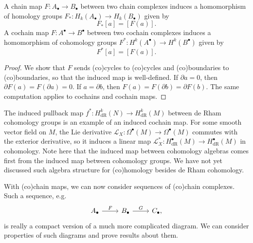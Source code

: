 \documentclass[a4paper,12pt]{article}
\begin{document}
\begin{proposition}\label{prop:induced_(co)chain_(co)homology_map}
    A chain map $F \colon A_\bullet \to B_\bullet$ between two chain complexes induces a homomorphism of homology groups $F_* \colon H_k(A_\bullet) \to H_k(B_\bullet)$ given by
    \begin{equation}
        F_*[a] = [F(a)].
    \end{equation}
    A cochain map $F \colon A^\bullet \to B^\bullet$ between two cochain complexes induces a homomorphism of cohomology groups $F^* \colon H^k(A^\bullet) \to H^k(B^\bullet)$ given by
    \begin{equation}
        F^*[a] = [F(a)].
    \end{equation}
\end{proposition}
\begin{proof}
    We show that $F$ sends (co)cycles to (co)cycles and (co)boundaries to (co)boundaries, so that the induced map is well-defined.
    If $\partial a = 0$, then $\partial F(a) = F(\partial a) = 0$.
    If $a = \partial b$, then $F(a) = F(\partial b) = \partial F(b)$.
    The same computation applies to cochains and cochain maps.
\end{proof}
\begin{example}
    The induced pullback map $f^* \colon H_{\mathrm{dR}}^k(N) \to H_{\mathrm{dR}}^k(M)$ between de Rham cohomology groups is an example of an induced cochain map.
    For some smooth vector field on $M$, the Lie derivative $\mathcal{L}_X \colon \Omega^\bullet(M) \to \Omega^\bullet(M)$ commutes with the exterior derivative, so it induces a linear map $\mathcal{L}^*_X \colon H_{\mathrm{dR}}^\bullet(M) \to H_{\mathrm{dR}}^\bullet(M)$ in cohomology.
    Note here that the induced map between cohomology algebras comes first from the induced map between cohomology groups.
    We have not yet discussed such algebra structure for (co)homology besides de Rham cohomology.
\end{example}
With (co)chain maps, we can now consider sequences of (co)chain complexes.
Such a sequence, e.g.
\[\begin{tikzcd}
	{A_\bullet} & {B_\bullet} & {C_\bullet},
	\arrow["F", from=1-1, to=1-2]
	\arrow["G", from=1-2, to=1-3]
\end{tikzcd}\]
is really a compact version of a much more complicated diagram.
We can consider properties of such diagrams and prove results about them.
\end{document}
